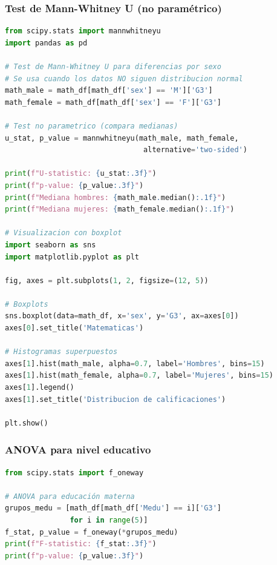 \documentclass[a4paper,12pt]{article}
\begin{document}
\subsubsection{Test de Mann-Whitney U (no paramétrico)}
\begin{lstlisting}[language=Python]
from scipy.stats import mannwhitneyu
import pandas as pd

# Test de Mann-Whitney U para diferencias por sexo
# Se usa cuando los datos NO siguen distribucion normal
math_male = math_df[math_df['sex'] == 'M']['G3']
math_female = math_df[math_df['sex'] == 'F']['G3']

# Test no parametrico (compara medianas)
u_stat, p_value = mannwhitneyu(math_male, math_female, 
                                alternative='two-sided')

print(f"U-statistic: {u_stat:.3f}")
print(f"p-value: {p_value:.3f}")
print(f"Mediana hombres: {math_male.median():.1f}")
print(f"Mediana mujeres: {math_female.median():.1f}")

# Visualizacion con boxplot
import seaborn as sns
import matplotlib.pyplot as plt

fig, axes = plt.subplots(1, 2, figsize=(12, 5))

# Boxplots
sns.boxplot(data=math_df, x='sex', y='G3', ax=axes[0])
axes[0].set_title('Matematicas')

# Histogramas superpuestos
axes[1].hist(math_male, alpha=0.7, label='Hombres', bins=15)
axes[1].hist(math_female, alpha=0.7, label='Mujeres', bins=15)
axes[1].legend()
axes[1].set_title('Distribucion de calificaciones')

plt.show()
\end{lstlisting}

\subsubsection{ANOVA para nivel educativo}
\begin{lstlisting}[language=Python]
from scipy.stats import f_oneway

# ANOVA para educación materna
grupos_medu = [math_df[math_df['Medu'] == i]['G3'] 
               for i in range(5)]
f_stat, p_value = f_oneway(*grupos_medu)
print(f"F-statistic: {f_stat:.3f}")
print(f"p-value: {p_value:.3f}")
\end{lstlisting}
\end{document}

